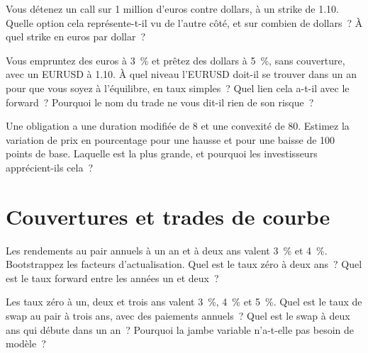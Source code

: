 \begin{question}\label{iq:iv2:rates-and-fx:11}
Vous détenez un call sur 1 million d'euros contre dollars, à un strike de 1.10. Quelle option cela représente-t-il vu de l'autre côté, et sur combien de dollars~? À quel strike en euros par dollar~?
\end{question}

\begin{question}\label{iq:iv2:rates-and-fx:12}
Vous empruntez des euros à 3~\% et prêtez des dollars à 5~\%, sans couverture, avec un EURUSD à 1.10. À quel niveau l'EURUSD doit-il se trouver dans un an pour que vous soyez à l'équilibre, en taux simples~? Quel lien cela a-t-il avec le forward~? Pourquoi le nom du trade ne vous dit-il rien de son risque~?
\end{question}

\begin{question}\label{iq:iv2:rates-and-fx:13}
Une obligation a une duration modifiée de 8 et une convexité de 80. Estimez la variation de prix en pourcentage pour une hausse et pour une baisse de 100 points de base. Laquelle est la plus grande, et pourquoi les investisseurs apprécient-ils cela~?
\end{question}

\section{Couvertures et trades de courbe}

\begin{question}\label{iq:iv2:rates-and-fx:14}
Les rendements au pair annuels à un an et à deux ans valent 3~\% et 4~\%. Bootstrappez les facteurs d'actualisation. Quel est le taux zéro à deux ans~? Quel est le taux forward entre les années un et deux~?
\end{question}

\begin{question}\label{iq:iv2:rates-and-fx:15}
Les taux zéro à un, deux et trois ans valent 3~\%, 4~\% et 5~\%. Quel est le taux de swap au pair à trois ans, avec des paiements annuels~? Quel est le swap à deux ans qui débute dans un an~? Pourquoi la jambe variable n'a-t-elle pas besoin de modèle~?
\end{question}

